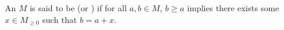 \begin{definition} \label{definition:algebraically_ordered_naturally_ordered_commutative_monoid}
    An  $M$ is said to be  (or ) if for all $a, b \in M$, $b \geq a$ implies there exists some $x \in M_{\geq 0}$ such that $b = a + x$.
\end{definition}
